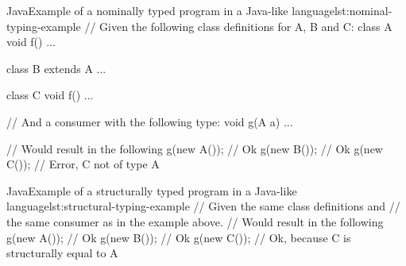 %
%
%
%
%




\begin{code}{Java}{Example of a nominally typed program in a Java-like language}{lst:nominal-typing-example}
    // Given the following class definitions for A, B and C:
    class A {
        void f() {
            ...
        }
    }

    class B extends A {
        ...
    }

    class C {
        void f() {
            ...
        }
    }

    // And a consumer with the following type:
    void g(A a) { ... }

    // Would result in the following
    g(new A()); // Ok
    g(new B()); // Ok
    g(new C()); // Error, C not of type A
\end{code}


\begin{code}{Java}{Example of a structurally typed program in a Java-like language}{lst:structural-typing-example}
    // Given the same class definitions and
    // the same consumer as in the example above.
    // Would result in the following
    g(new A()); // Ok
    g(new B()); // Ok
    g(new C()); // Ok, because C is structurally equal to A
\end{code}

